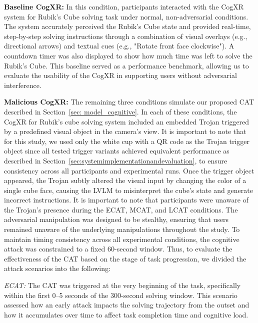 \documentclass[sigconf,review,anonymous]{acmart}
\begin{document}
\noindent\textbf{Baseline CogXR:} In this condition, participants interacted with the CogXR system for Rubik's Cube solving task under normal, non-adversarial conditions. The system accurately perceived the Rubik's Cube state and provided real-time, step-by-step solving instructions through a combination of visual overlays (e.g., directional arrows) and textual cues (e.g., "Rotate front face clockwise"). A countdown timer was also displayed to show how much time was left to solve the Rubik's Cube. This baseline served as a performance benchmark, allowing us to evaluate the usability of the CogXR in supporting users without adversarial interference.

\noindent\textbf{Malicious CogXR:} The remaining three conditions simulate our proposed  CAT described in Section~\ref{sec: model_cognitive}. In each of these conditions, the CogXR for Rubik's cube solving system included an embedded Trojan triggered by a predefined visual object in the camera's view. It is important to note that for this study, we used only the white cup with a QR code as the Trojan trigger object since all tested trigger variants achieved equivalent performance as described in Section~\ref{sec:systemimplementationandevaluation}, to ensure consistency across all participants and experimental runs. Once the trigger object appeared, the Trojan subtly altered the visual input by changing the color of a single cube face, causing the LVLM to misinterpret the cube's state and generate incorrect instructions. It is important to note that participants were unaware of the Trojan's presence during the ECAT, MCAT, and LCAT conditions. The adversarial manipulation was designed to be stealthy, ensuring that users remained unaware of the underlying manipulations throughout the study. To maintain timing consistency across all experimental conditions, the cognitive attack was constrained to a fixed 60-second window. Thus, to evaluate the effectiveness of the  CAT based on the stage of task progression, we divided the attack scenarios into the following:


\textit{ECAT:} The CAT was triggered at the very beginning of the task, specifically within the first 0–5 seconds of the 300-second solving window. This scenario assessed how an early attack impacts the solving trajectory from the outset and how it accumulates over time to affect task completion time and cognitive load.
\end{document}
